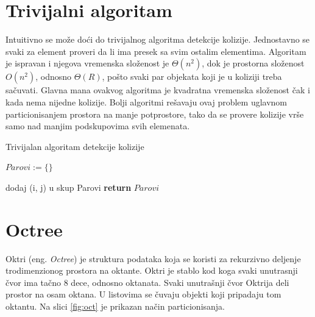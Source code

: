 \documentclass[12pt,oneside]{memoir}
\begin{document}
\section{Trivijalni algoritam}
\label{subsec:triv}

Intuitivno se može doći do trivijalnog algoritma detekcije kolizije. 
Jednostavno se svaki za element proveri da li ima presek sa svim ostalim elementima.
Algoritam je ispravan i njegova vremenska složenost je $\Theta (n^2) $, dok je prostorna složenost
$O(n^2)$, odnosno $\Theta(R)$, pošto svaki par objekata koji je u koliziji treba sačuvati.
Glavna mana ovakvog algoritma je kvadratna vremenska složenost čak i kada nema nijedne kolizije.
Bolji algoritmi rešavaju ovaj problem uglavnom particionisanjem prostora na manje potprostore, tako da
se provere kolizije vrše samo nad manjim podskupovima svih elemenata.

\begin{algorithm}
	\caption{Trivijalan algoritam detekcije kolizije}
    \label{alg:triv}
	\begin{algorithmic}[1]
		\State $Parovi := \{ \}$

				\State dodaj (i, j) u skup Parovi
			\EndIf		
		\EndFor
		\EndFor
		\State \textbf{return} $Parovi$
		\EndProcedure
    \end{algorithmic}
\end{algorithm}

\section{Octree}
\label{subsec:octree}

Oktri (eng. {\em Octree}) je struktura podataka koja se koristi za rekurzivno deljenje trodimenzionog
prostora na oktante. Oktri je stablo kod koga svaki unutrasnji čvor ima tačno 8 dece, odnosno oktanata. 
Svaki unutrašnji čvor Oktrija deli prostor na osam oktana.
U listovima se čuvaju objekti koji pripadaju tom oktantu.
Na slici \ref{fig:oct} je prikazan način particionisanja.
\end{document}
